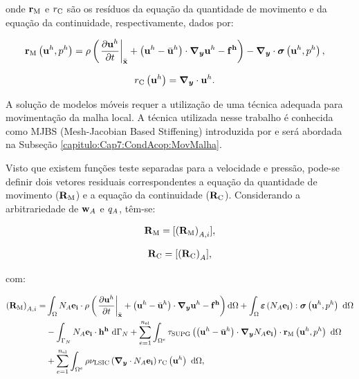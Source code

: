 \documentclass[tese_patricia]{subfiles}%
\begin{document}
\noindent onde $\mathbf{r}_{\mathrm{M}}$ e ${r}_{\mathrm{C}}$ são os resíduos da equação da quantidade de movimento e da equação da continuidade, respectivamente, dados por:

\begin{align}
\mathbf{r}_{\mathrm{M}}\left(\mathbf{u}^h,p^h\right)&=\rho\left(\left. \frac{\partial\mathbf{u}^h}{\partial t}\right|_{\bar{\mathbf{x}}}+\left(\mathbf{u}^h - \bar{\mathbf{u}}^h \right)\cdot \boldsymbol{\nabla_y} \mathbf{u}^h - \mathbf{f^h}\right) - \boldsymbol{\nabla_y} \cdot \boldsymbol{\sigma}\left(\mathbf{u}^h,p^h\right),
\end{align}

\noindent

\begin{align}
{r}_{\mathrm{C}}\left(\mathbf{u}^h\right)&=\boldsymbol{\nabla_y} \cdot \mathbf{u}^h.
\end{align}

A solução de modelos móveis requer a utilização de uma técnica adequada para movimentação da malha local. A técnica utilizada nesse trabalho é conhecida como MJBS (Mesh-Jacobian Based Stiffening) introduzida por  e será abordada na Subseção \ref{capitulo:Cap7:CondAcop:MovMalha}.

Visto que existem funções teste separadas para a velocidade e pressão, pode-se definir dois vetores residuais correspondentes a equação da quantidade de movimento ($\mathbf{R}_\mathrm{M}$) e a equação da continuidade ($\mathbf{R}_\mathrm{C}$). Considerando a arbitrariedade de $\mathbf{w}_{A}$ e $q_{A}$, têm-se:

\begin{align}
\mathbf{R}_\mathrm{M}  = [\left(\mathbf{R}_\mathrm{M}\right)_{A,i}],
\end{align}

\begin{align}
\mathbf{R}_\mathrm{C} =  [\left(\mathbf{R}_\mathrm{C}\right)_{A}],
\end{align}
	
\noindent com:

\begin{align}
	\begin{split}
	\left(\NNSM\right)_{A,i} =&\int_{\domain} \shapef_{A}\mathbf{e_i} \cdot \density\left(\left. \frac{\partial\velocityh}{\partial t}\right|_{\posALE}+\left(\velocityh - \velocityALEh \right)\cdot \gradient \velocityh - \sbodyforceh\right) \deriv \domain +\int_{\domain} \straintensor \left(\shapef_{A}\mathbf{e_i}\right) : \stressTensor \left(\velocityh,\pressh\right)\ \deriv \domain\\ &
	- \int_{\boundaryN}\shapef_{A}\mathbf{e_i} \cdot \surfaceLoadh \ \deriv \boundaryN 
	+ \sum_{e=1}^{\nel} \int_{\domainE} \SUPG \left(\left(\velocityh - \velocityALEh \right) \cdot \gradient \shapef_{A}\mathbf{e_i}\right) \cdot \resMom\left(\velocityh,\pressh \right)\  \deriv \domain\\
	&+ \sum_{e=1}^{\nel} \int_{\domainE} \density \LSIC \left(\divergence \cdot \shapef_{A}\mathbf{e_i}\right) \resPre\left(\velocityh\right)\  \deriv \domain  ,
	\end{split}
\end{align}
\end{document}
